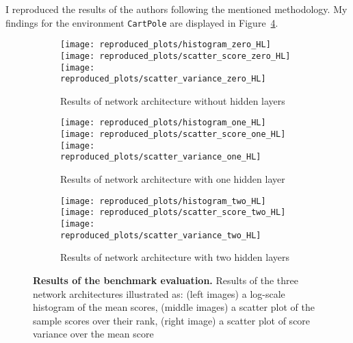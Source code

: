 I reproduced the results of the authors following the mentioned methodology. My findings for the environment \verb|CartPole| are displayed in Figure~\ref{fig:plots_reproduced}.
\begin{figure}[ht]
\centering
\begin{subfigure}{\textwidth}
  \centering
  \texttt{[image: reproduced\_plots/histogram\_zero\_HL]}
  \texttt{[image: reproduced\_plots/scatter\_score\_zero\_HL]}
  \texttt{[image: reproduced\_plots/scatter\_variance\_zero\_HL]}
    \caption{Results of network architecture without hidden layers}
    \label{fig:plots_reproduced_first}
\end{subfigure}
\begin{subfigure}{\textwidth}
  \centering
  \texttt{[image: reproduced\_plots/histogram\_one\_HL]}
  \texttt{[image: reproduced\_plots/scatter\_score\_one\_HL]}
  \texttt{[image: reproduced\_plots/scatter\_variance\_one\_HL]}
    \caption{Results of network architecture with one hidden layer}
    \label{fig:plots_reproduced_second}
\end{subfigure}
\begin{subfigure}{\textwidth}
  \centering
  \texttt{[image: reproduced\_plots/histogram\_two\_HL]}
  \texttt{[image: reproduced\_plots/scatter\_score\_two\_HL]}
  \texttt{[image: reproduced\_plots/scatter\_variance\_two\_HL]}
    \caption{Results of network architecture with two hidden layers}
    \label{fig:plots_reproduced_third}
\end{subfigure}
\caption[Reproduced Plots]{
  \textbf{Results of the benchmark evaluation.}
   Results of the three network architectures illustrated as: (left images) a log-scale histogram of the mean scores, (middle images) a scatter plot of the sample scores over their rank, (right image) a scatter plot of score variance over the mean score
}
\label{fig:plots_reproduced}
\end{figure}
